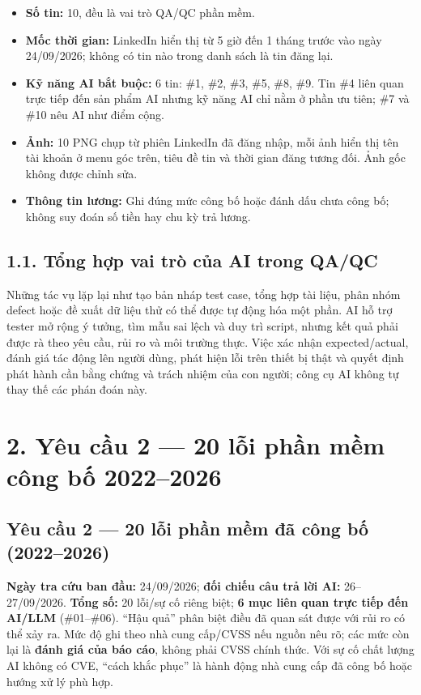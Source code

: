 \begin{itemize}
\tightlist
\item
  \textbf{Số tin:} 10, đều là vai trò QA/QC phần mềm.
\item
  \textbf{Mốc thời gian:} LinkedIn hiển thị từ 5 giờ đến 1 tháng trước vào ngày 24/09/2026; không có tin nào trong danh sách là tin đăng lại.
\item
  \textbf{Kỹ năng AI bắt buộc:} 6 tin: \#1, \#2, \#3, \#5, \#8, \#9. Tin \#4 liên quan trực tiếp đến sản phẩm AI nhưng kỹ năng AI chỉ nằm ở phần ưu tiên; \#7 và \#10 nêu AI như điểm cộng.
\item
  \textbf{Ảnh:} 10 PNG chụp từ phiên LinkedIn đã đăng nhập, mỗi ảnh hiển thị tên tài khoản ở menu góc trên, tiêu đề tin và thời gian đăng tương đối. Ảnh gốc không được chỉnh sửa.
\item
  \textbf{Thông tin lương:} Ghi đúng mức công bố hoặc đánh dấu chưa công bố; không suy đoán số tiền hay chu kỳ trả lương.
\end{itemize}

\subsection{1.1. Tổng hợp vai trò của AI trong QA/QC}\label{tux1ed5ng-hux1ee3p-vai-truxf2-cux1ee7a-ai-trong-qaqc}

Những tác vụ lặp lại như tạo bản nháp test case, tổng hợp tài liệu, phân nhóm defect hoặc đề xuất dữ liệu thử có thể được tự động hóa một phần. AI hỗ trợ tester mở rộng ý tưởng, tìm mẫu sai lệch và duy trì script, nhưng kết quả phải được rà theo yêu cầu, rủi ro và môi trường thực. Việc xác nhận expected/actual, đánh giá tác động lên người dùng, phát hiện lỗi trên thiết bị thật và quyết định phát hành cần bằng chứng và trách nhiệm của con người; công cụ AI không tự thay thế các phán đoán này.

\section{2. Yêu cầu 2 --- 20 lỗi phần mềm công bố 2022--2026}\label{defects}

\subsection{Yêu cầu 2 --- 20 lỗi phần mềm đã công bố (2022--2026)}\label{yuxeau-cux1ea7u-2-20-lux1ed7i-phux1ea7n-mux1ec1m-ux111uxe3-cuxf4ng-bux1ed1-20222026}

\textbf{Ngày tra cứu ban đầu:} 24/09/2026; \textbf{đối chiếu câu trả lời AI:} 26--27/09/2026. \textbf{Tổng số:} 20 lỗi/sự cố riêng biệt; \textbf{6 mục liên quan trực tiếp đến AI/LLM} (\#01--\#06). ``Hậu quả'' phân biệt điều đã quan sát được với rủi ro có thể xảy ra. Mức độ ghi theo nhà cung cấp/CVSS nếu nguồn nêu rõ; các mức còn lại là \textbf{đánh giá của báo cáo}, không phải CVSS chính thức. Với sự cố chất lượng AI không có CVE, ``cách khắc phục'' là hành động nhà cung cấp đã công bố hoặc hướng xử lý phù hợp.

